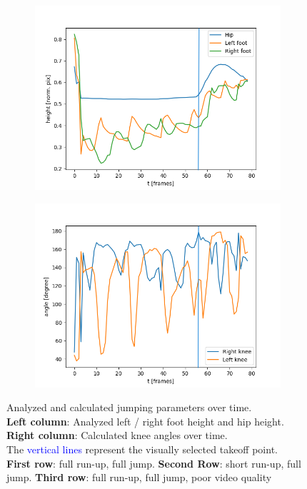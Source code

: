 \begin{figure}[h!]
\begin{subfigure}[b]{0.5\textwidth}
        \includegraphics*[scale=0.45]{jump_runup_poor.png}
        \label{subfig:runup_jump_height}
    \end{subfigure}
    \begin{subfigure}[b]{0.5\textwidth}
        \includegraphics*[scale=0.45]{jump_runup_poor_angles.png}
        \label{subfig:runup_jump_angles}
    \end{subfigure}
    \caption[Analyzed jumping parameters over time]{Analyzed and calculated
    jumping parameters over time.\\
    \textbf{Left column}: Analyzed left / right foot height and hip height.\\
    \textbf{Right column}: Calculated knee angles over time.\\
    The \textcolor{blue}{vertical lines} represent the visually selected
    takeoff point.\\
    \textbf{First row}: full run-up, full jump. \textbf{Second Row}: short 
    run-up, full jump.
    \textbf{Third row}: full run-up, full jump, poor video quality}
    \label{fig:4_angles_height_plot}
\end{figure}
\FloatBarrier


